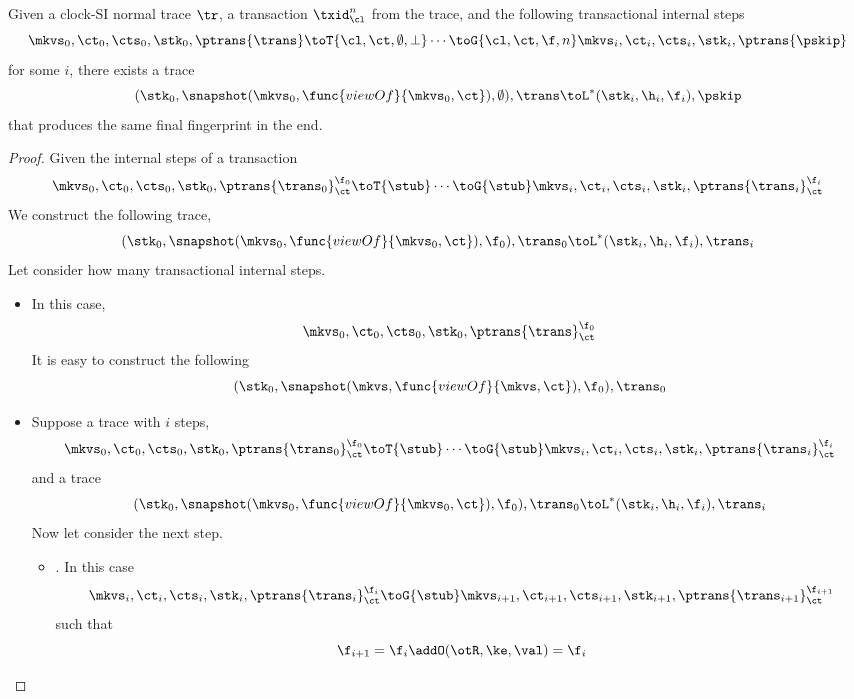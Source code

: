 \begin{theorem}[Simulation]
    Given a clock-SI normal trace \( \tr \), a transaction \( \txid_\cl^n \) from the trace,
    and the following transactional internal steps
    \[
        \mkvs_0, \ct_0, \cts_0, \stk_0, \ptrans{\trans} \toT{\cl,\ct,\emptyset,\perp} \cdots  \toG{\cl,\ct,\f,n} \mkvs_i, \ct_i, \cts_i, \stk_i, \ptrans{\pskip}
    \]
    for some \( i \), there exists a trace
    \[
        (\stk_0, \snapshot(\mkvs_0,\func{viewOf}{\mkvs_0,\ct}), \emptyset), \trans \toL^*
        (\stk_i, \h_i, \f_i), \pskip
    \]
    that produces the same final fingerprint in the end.
\end{theorem}
\begin{proof}
    Given the internal steps of a transaction
    \[
        \mkvs_0, \ct_0, \cts_0, \stk_0, \ptrans{\trans_0}_\ct^{\f_0} \toT{\stub} 
        \cdots  \toG{\stub} \mkvs_i, \ct_i, \cts_i, \stk_i, \ptrans{\trans_i}_\ct^{\f_i}
    \]
    We construct the following trace,
    \[
        (\stk_0, \snapshot(\mkvs_0,\func{viewOf}{\mkvs_0,\ct}), \f_0), \trans_0 \toL^*
        (\stk_i, \h_i, \f_i), \trans_i
    \]
    Let consider how many transactional internal steps.
    \begin{itemize}
        \item {}
        In this case, 
        \[
            \mkvs_0, \ct_0, \cts_0, \stk_0, \ptrans{\trans}_\ct^{\f_0}
        \]
        It is easy to construct the following
        \[
            (\stk_0, \snapshot(\mkvs,\func{viewOf}{\mkvs,\ct}), \f_0), \trans_0 
        \]
        \item {}
        Suppose  a trace with \(i\) steps,
        \[
            \mkvs_0, \ct_0, \cts_0, \stk_0, \ptrans{\trans_0}_\ct^{\f_0} \toT{\stub} 
            \cdots  \toG{\stub} \mkvs_i, \ct_i, \cts_i, \stk_i, \ptrans{\trans_i}_\ct^{\f_i}
        \]
        and a trace
        \[
            (\stk_0, \snapshot(\mkvs_0,\func{viewOf}{\mkvs_0,\ct}), \f_0), \trans_0 \toL^*
            (\stk_i, \h_i, \f_i), \trans_i
        \]
        Now let consider the next step.
        \begin{itemize}
            \item {}.
                In this case
                \[
                    \mkvs_i, \ct_i, \cts_i, \stk_i, \ptrans{\trans_i}_\ct^{\f_i}
                    \toG{\stub}
                    \mkvs_{i+1}, \ct_{i+1}, \cts_{i+1}, \stk_{i+1}, \ptrans{\trans_{i+1}}_\ct^{\f_{i+1}}
                \]
                such that
                \[
                    \f_{i+1} = \f_i \addO (\otR, \ke, \val)  = \f_i
\]
\end{itemize}
\end{itemize}
\end{proof}
